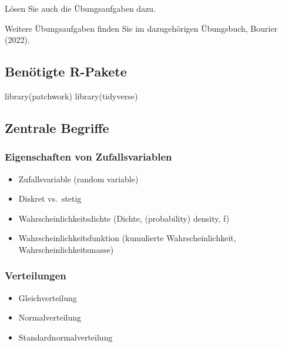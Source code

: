 \documentclass[
  a4paper,
  DIV=11]{scrreprt}
\newenvironment{Shaded}{\begin{snugshade}}{\end{snugshade}}
\newcommand{\FunctionTok}[1]{\textcolor[rgb]{0.28,0.35,0.67}{#1}}
\newcommand{\NormalTok}[1]{\textcolor[rgb]{0.00,0.23,0.31}{#1}}
\providecommand{\tightlist}{%
  \setlength{\itemsep}{0pt}\setlength{\parskip}{0pt}}\usepackage{longtable,booktabs,array}
\theoremstyle{definition}
\theoremstyle{remark}
\begin{document}
Lösen Sie auch die Übungsaufgaben dazu.

Weitere Übungsaufgaben finden Sie im dazugehörigen Übungsbuch, Bourier
(2022).

\hypertarget{benuxf6tigte-r-pakete}{%
\subsection{Benötigte R-Pakete}\label{benuxf6tigte-r-pakete}}

\begin{Shaded}
\begin{Highlighting}[]
\FunctionTok{library}\NormalTok{(patchwork)}
\FunctionTok{library}\NormalTok{(tidyverse)}
\end{Highlighting}
\end{Shaded}

\hypertarget{zentrale-begriffe-1}{%
\subsection{Zentrale Begriffe}\label{zentrale-begriffe-1}}

\hypertarget{eigenschaften-von-zufallsvariablen}{%
\subsubsection{Eigenschaften von
Zufallsvariablen}\label{eigenschaften-von-zufallsvariablen}}

\begin{itemize}
\tightlist
\item
  Zufallsvariable (random variable)
\item
  Diskret vs.~stetig
\item
  Wahrscheinlichkeitsdichte (Dichte, (probability) density, f)
\item
  Wahrscheinlichkeitsfunktion (kumulierte Wahrscheinlichkeit,
  Wahrscheinlichkeitsmasse)
\end{itemize}

\hypertarget{verteilungen-1}{%
\subsubsection{Verteilungen}\label{verteilungen-1}}

\begin{itemize}
\tightlist
\item
  Gleichverteilung
\item
  Normalverteilung
\item
  Standardnormalverteilung
\end{itemize}
\end{document}
